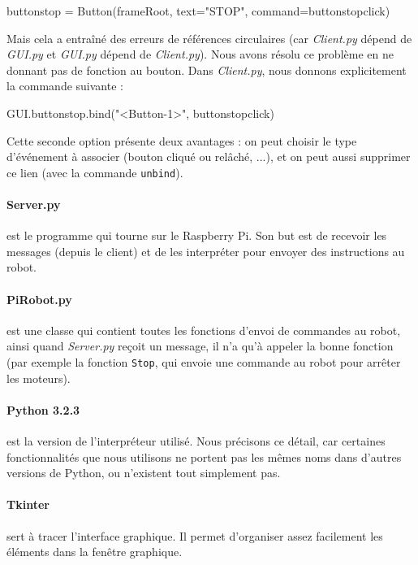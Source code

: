 \documentclass[12pt,a4paper]{report}
\begin{document}
\begin{verbatimtab}[3]
buttonstop = Button(frameRoot, text="STOP", command=buttonstopclick)
\end{verbatimtab}

Mais cela a entraîné des erreurs de références circulaires (car \textit{Client.py} dépend de \textit{GUI.py} et \textit{GUI.py} dépend de \textit{Client.py}). Nous avons résolu ce problème en ne donnant pas de fonction au bouton. Dans \textit{Client.py}, nous donnons explicitement la commande suivante :

\begin{verbatimtab}[3]
GUI.buttonstop.bind("<Button-1>", buttonstopclick)
\end{verbatimtab}

Cette seconde option présente deux avantages : on peut choisir le type d'événement à associer (bouton cliqué ou relâché, ...), et on peut aussi supprimer ce lien (avec la commande \verb=unbind=).

\paragraph{Server.py} est le programme qui tourne sur le Raspberry Pi. Son but est de recevoir les messages (depuis le client) et de les interpréter pour envoyer des instructions au robot.

\paragraph{PiRobot.py} est une classe qui contient toutes les fonctions d'envoi de commandes au robot, ainsi quand \textit{Server.py} reçoit un message, il n'a qu'à appeler la bonne fonction (par exemple la fonction \verb=Stop=, qui envoie une commande au robot pour arrêter les moteurs).

\paragraph{Python 3.2.3} est la version de l'interpréteur utilisé. Nous précisons ce détail, car certaines fonctionnalités que nous utilisons ne portent pas les mêmes noms dans d'autres versions de Python, ou n'existent tout simplement pas.

\paragraph{Tkinter} sert à tracer l'interface graphique. Il permet d'organiser assez facilement les éléments dans la fenêtre graphique.
\end{document}
